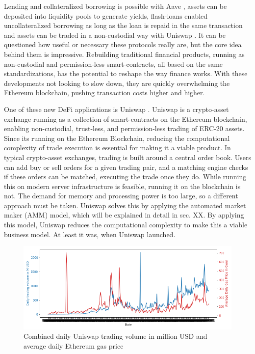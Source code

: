 \documentclass[11pt,twoside,a4paper,final]{book}
\begin{document}
Lending and collateralized borrowing is possible with Aave \cite{kulechov_2020}, assets can be deposited into liquidity pools\cite{adams2020uniswap} to generate yields, flash-loans \cite{kulechov_2020}\cite{adams2020uniswap} enabled uncollateralized borrowing as long as the loan is repaid in the same transaction and assets can be traded in a non-custodial way with Uniswap \cite{adams2020uniswap} . It can be questioned how useful or necessary these protocols really are, but the core idea behind them is impressive. Rebuilding traditional financial products, running as non-custodial and permission-less smart-contracts, all based on the same standardizations, has the potential to reshape the way finance works. With these developments not looking to slow down, they are quickly overwhelming the Ethereum blockchain, pushing transaction costs \cite{gasprice} higher and higher. 

One of these new DeFi applications is Uniswap \cite{adams2020uniswap}. Uniswap is a crypto-asset exchange running as a collection of smart-contracts on the Ethereum blockchain, enabling non-custodial, trust-less, and permission-less trading of ERC-20 assets. Since its running on the Ethereum Blockchain, reducing the computational complexity of trade execution is essential for making it a viable product. In typical crypto-asset exchanges, trading is built around a central order book. Users can add buy or sell orders for a given trading pair, and a matching engine checks if these orders can be matched, executing the trade once they do. While running this on modern server infrastructure is feasible, running it on the blockchain is not. The demand for memory and processing power is too large, so a different approach must be taken. Uniswap solves this by applying the automated market maker (AMM) model, which will be explained in detail in sec. XX. By applying this model, Uniswap reduces the computational complexity to make this a viable business model. At least it was, when Uniswap launched. 

\begin{figure}[h]
    \centerline{\includegraphics[totalheight=5.6cm]{diagrams/gas_volume.png}}
    \caption{Combined daily Uniswap trading volume in million USD and average daily Ethereum gas price}
    \label{fig:gas_vol}
\end{figure}
\end{document}
